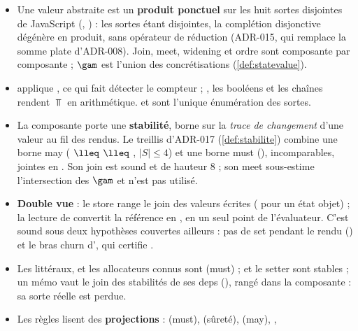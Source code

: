 \begin{resume}
\begin{itemize}
  \item Une valeur abstraite est un \textbf{produit ponctuel} sur les huit
    sortes disjointes de JavaScript (,
    ) : les sortes étant disjointes,
    la complétion disjonctive dégénère en produit, sans opérateur de
    réduction (ADR-015, qui remplace la somme plate d'ADR-008). Join, meet,
    widening et ordre sont composante par composante ; $\gam$ est l'union des
    concrétisations (\cref{def:statevalue}).
  \item {} applique , ce qui fait
    détecter le compteur  ; , les
    booléens et les chaînes rendent $\Top$ en arithmétique.
     et  sont l'unique énumération des
    sortes.
  \item La composante  porte une \textbf{stabilité},
    borne sur la \emph{trace de changement} d'une valeur au fil des rendus.
    Le treillis  d'ADR-017 (\cref{def:stabilite}) combine une
    borne may ( $\lleq$  $\lleq$
    , $|S| \le 4$) et une borne must (),
    incomparables, jointes en . Son join est sound et de
    hauteur 8 ; son meet sous-estime l'intersection des $\gam$ et n'est pas
    utilisé.
  \item \textbf{Double vue} : le store range le join des valeurs écrites
    ( pour un état objet) ; la lecture de
     convertit la référence en , en un
    seul point de l'évaluateur. C'est sound sous deux hypothèses couvertes
    ailleurs : pas de set pendant le rendu () et le
    bras churn d', qui certifie .
  \item Les littéraux,  et les allocateurs connus sont
     (must) ;  et le setter sont stables ; un
    mémo vaut le join des stabilités de ses deps (),
    rangé dans la composante  : sa sorte réelle est perdue.
  \item Les règles lisent des \textbf{projections} :
     (must),  (sûreté),
     (may), ,

\end{itemize}
\end{resume}
